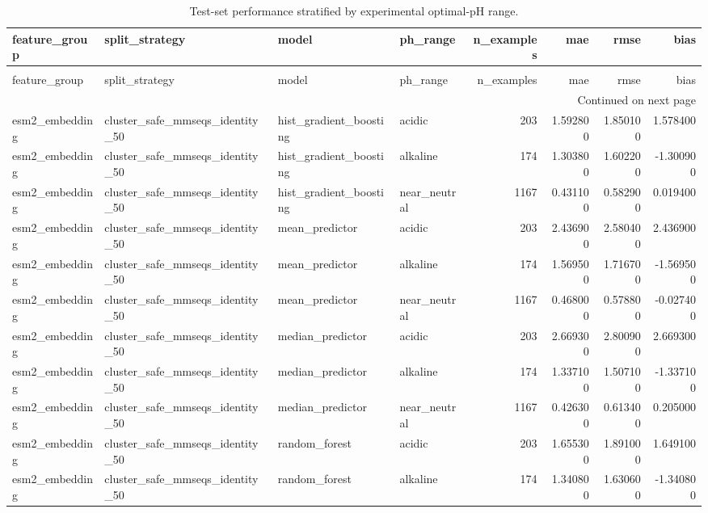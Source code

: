\begin{longtable}{llllrrrr}
\caption{Test-set performance stratified by experimental optimal-pH range.} \label{tab:performance-by-ph-range} \\
\toprule
feature\_group & split\_strategy & model & ph\_range & n\_examples & mae & rmse & bias \\
\midrule
\endfirsthead
\caption[]{Test-set performance stratified by experimental optimal-pH range.} \\
\toprule
feature\_group & split\_strategy & model & ph\_range & n\_examples & mae & rmse & bias \\
\midrule
\endhead
\midrule
\multicolumn{8}{r}{Continued on next page} \\
\midrule
\endfoot
\bottomrule
\endlastfoot
esm2\_embedding & cluster\_safe\_mmseqs\_identity\_50 & hist\_gradient\_boosting & acidic & 203 & 1.592800 & 1.850100 & 1.578400 \\
esm2\_embedding & cluster\_safe\_mmseqs\_identity\_50 & hist\_gradient\_boosting & alkaline & 174 & 1.303800 & 1.602200 & -1.300900 \\
esm2\_embedding & cluster\_safe\_mmseqs\_identity\_50 & hist\_gradient\_boosting & near\_neutral & 1167 & 0.431100 & 0.582900 & 0.019400 \\
esm2\_embedding & cluster\_safe\_mmseqs\_identity\_50 & mean\_predictor & acidic & 203 & 2.436900 & 2.580400 & 2.436900 \\
esm2\_embedding & cluster\_safe\_mmseqs\_identity\_50 & mean\_predictor & alkaline & 174 & 1.569500 & 1.716700 & -1.569500 \\
esm2\_embedding & cluster\_safe\_mmseqs\_identity\_50 & mean\_predictor & near\_neutral & 1167 & 0.468000 & 0.578800 & -0.027400 \\
esm2\_embedding & cluster\_safe\_mmseqs\_identity\_50 & median\_predictor & acidic & 203 & 2.669300 & 2.800900 & 2.669300 \\
esm2\_embedding & cluster\_safe\_mmseqs\_identity\_50 & median\_predictor & alkaline & 174 & 1.337100 & 1.507100 & -1.337100 \\
esm2\_embedding & cluster\_safe\_mmseqs\_identity\_50 & median\_predictor & near\_neutral & 1167 & 0.426300 & 0.613400 & 0.205000 \\
esm2\_embedding & cluster\_safe\_mmseqs\_identity\_50 & random\_forest & acidic & 203 & 1.655300 & 1.891000 & 1.649100 \\
esm2\_embedding & cluster\_safe\_mmseqs\_identity\_50 & random\_forest & alkaline & 174 & 1.340800 & 1.630600 & -1.340800 \\

\end{longtable}

